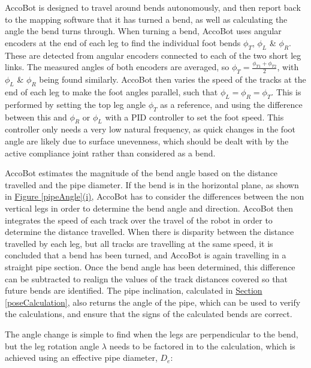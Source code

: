 \documentclass[11pt]{article}		%
\newcommand{\sectref}[1]{\hyperref[#1]{Section \ref*{#1}}}     %
\begin{document}
			\begin{floatingfigure}[r]{0pt} \end{floatingfigure}
			
			AccoBot is designed to travel around bends autonomously, and then report back to the mapping software that it has turned a bend, as well as calculating the angle the bend turns through.
			When turning a bend, AccoBot uses angular encoders at the end of each leg to find the individual foot bends $\phi_T$, $\phi_L$ \& $\phi_R$.
			These are detected from angular encoders connected to each of the two short leg links.
			The measured angles of both encoders are averaged, so $\phi_T = \frac{\phi_{T1} + \phi_{T2}}{2}$, with $\phi_L$ \& $\phi_R$ being found similarly.
			AccoBot then varies the speed of the tracks at the end of each leg to make the foot angles parallel, such that $\phi_L = \phi_R = \phi_T$.
			This is performed by setting the top leg angle $\phi_T$ as a reference, and using the difference between this and $\phi_R$ or $\phi_L$ with a PID controller to set the foot speed.
			This controller only needs a very low natural frequency, as quick changes in the foot angle are likely due to surface unevenness, which should be dealt with by the active compliance joint rather than considered as a bend.
			
			AccoBot estimates the magnitude of the bend angle based on the distance travelled and the pipe diameter.
			If the bend is in the horizontal plane, as shown in \hyperref[pipeAngle]{Figure \ref*{pipeAngle}(i)}, AccoBot has to consider the differences between the non vertical legs in order to determine the bend angle and direction.
			AccoBot then integrates the speed of each track over the travel of the robot in order to determine the distance travelled.
			When there is disparity between the distance travelled by each leg, but all tracks are travelling at the same speed, it is concluded that a bend has been turned, and AccoBot is again travelling in a straight pipe section.
			Once the bend angle has been determined, this difference can be subtracted to realign the values of the track distances covered so that future bends are identified.
			The pipe inclination, calculated in \sectref{poseCalculation}, also returns the angle of the pipe, which can be used to verify the calculations, and ensure that the signs of the calculated bends are correct.	
			
			The angle change is simple to find when the legs are perpendicular to the bend, but the leg rotation angle $\lambda$ needs to be factored in to the calculation, which is achieved using an effective pipe diameter, $D_{e}$:
			
\end{document}
